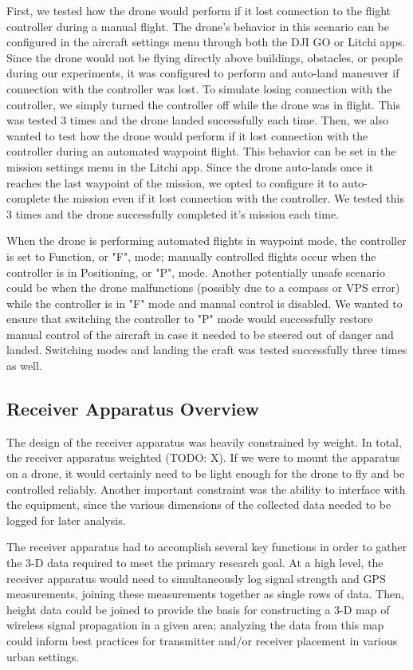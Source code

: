 \documentclass[pageno]{jpaper}
\begin{document}
First, we tested how the drone would perform if it lost connection to the flight controller during a manual flight. The drone's behavior in this scenario can be configured in the aircraft settings menu through both the DJI GO or Litchi apps. Since the drone would not be flying directly above buildings, obstacles, or people during our experiments, it was configured to perform and auto-land maneuver if connection with the controller was lost. To simulate losing connection with the controller, we simply turned the controller off while the drone was in flight. This was tested 3 times and the drone landed successfully each time. Then, we also wanted to test how the drone would perform if it lost connection with the controller during an automated waypoint flight. This behavior can be set in the mission settings menu in the Litchi app. Since the drone auto-lands once it reaches the last waypoint of the mission, we opted to configure it to auto-complete the mission even if it lost connection with the controller. We tested this 3 times and the drone successfully completed it's mission each time. 

When the drone is performing automated flights in waypoint mode, the controller is set to Function, or "F", mode; manually controlled flights occur when the controller is in Positioning, or "P", mode. Another potentially unsafe scenario could be when the drone malfunctions (possibly due to a compass or VPS error) while the controller is in "F" mode and manual control is disabled. We wanted to ensure that switching the controller to "P" mode would successfully restore manual control of the aircraft in case it needed to be steered out of danger and landed. Switching modes and landing the craft was tested successfully three times as well.

\subsection{Receiver Apparatus Overview}
The design of the receiver apparatus was heavily constrained by weight. In total, the receiver apparatus weighted (TODO: X). If we were to mount the apparatus on a drone, it would certainly need to be light enough for the drone to fly and be controlled reliably. Another important constraint was the ability to interface with the equipment, since the various dimensions of the collected data needed to be logged for later analysis.

The receiver apparatus had to accomplish several key functions in order to gather the 3-D data required to meet the primary research goal. At a high level, the receiver apparatus would need to simultaneously log signal strength and GPS measurements, joining these measurements together as single rows of data. Then, height data could be joined to provide the basis for constructing a 3-D map of wireless signal propagation in a given area; analyzing the data from this map could inform best practices for transmitter and/or receiver placement in various urban settings.
\end{document}
